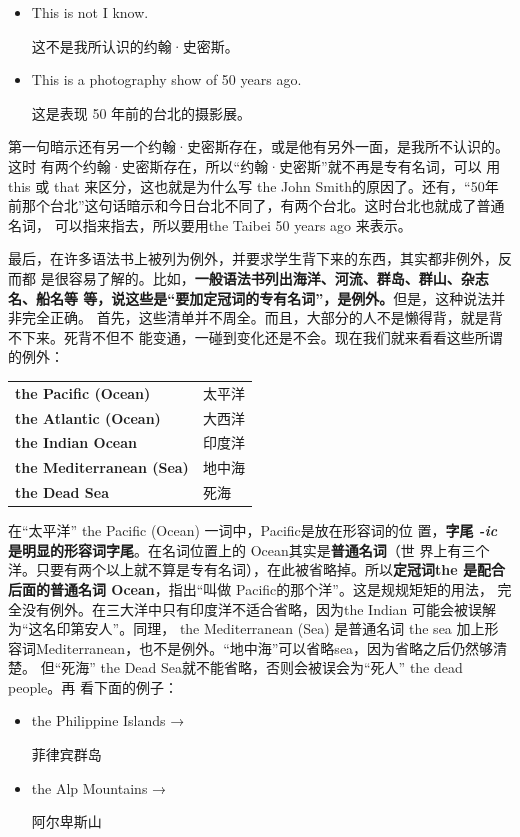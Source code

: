 \begin{itemize}
\item  This is not  I know.

这不是我所认识的约翰·史密斯。
\item  This is a photography show of  50 years ago.

这是表现 50 年前的台北的摄影展。
\end{itemize}

第一句暗示还有另一个约翰·史密斯存在，或是他有另外一面，是我所不认识的。这时
有两个约翰·史密斯存在，所以“约翰·史密斯”就不再是专有名词，可以
用this 或 that 来区分，这也就是为什么写 the John Smith的原因了。还有，“50年
前那个台北”这句话暗示和今日台北不同了，有两个台北。这时台北也就成了普通名词，
可以指来指去，所以要用the Taibei 50 years ago 来表示。

最后，在许多语法书上被列为例外，并要求学生背下来的东西，其实都非例外，反而都
是很容易了解的。比如，\textbf{一般语法书列出海洋、河流、群岛、群山、杂志名、船名等
  等，说这些是“要加定冠词的专有名词”，是例外。}但是，这种说法并非完全正确。
首先，这些清单并不周全。而且，大部分的人不是懒得背，就是背不下来。死背不但不
能变通，一碰到变化还是不会。现在我们就来看看这些所谓的例外：

\begin{longtable}[]{@{}ll@{}}
  \textbf{the Pacific (Ocean)} & 太平洋 \\
  \textbf{the Atlantic (Ocean)} & 大西洋 \\
  \textbf{the Indian Ocean} & 印度洋 \\
  \textbf{the Mediterranean (Sea)} & 地中海 \\
  \textbf{the Dead Sea} & 死海 \\
\end{longtable}

在“太平洋” the Pacific (Ocean) 一词中，Pacific是放在形容词的位
置，\textbf{字尾 \emph{-ic} 是明显的形容词字尾}。在名词位置上的 Ocean其实是\textbf{普通名词}（世
界上有三个洋。只要有两个以上就不算是专有名词），在此被省略掉。所以\textbf{定冠词the
  是配合后面的普通名词 Ocean}，指出“叫做 Pacific的那个洋”。这是规规矩矩的用法，
完全没有例外。在三大洋中只有印度洋不适合省略，因为the Indian 可能会被误解
为“这名印第安人”。同理， the Mediterranean (Sea) 是普通名词 the sea 加上形
容词Mediterranean，也不是例外。“地中海”可以省略sea，因为省略之后仍然够清楚。
但“死海” the Dead Sea就不能省略，否则会被误会为“死人” the dead people。再
看下面的例子：

\begin{itemize}
\item  the Philippine Islands → 

菲律宾群岛
\item  the Alp Mountains → 

阿尔卑斯山
\end{itemize}

